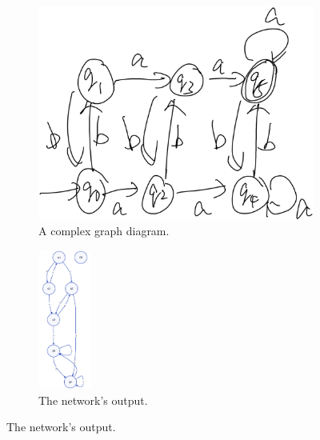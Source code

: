 \documentclass[conference]{IEEEtran}
\begin{document}
\begin{figure}[htbp]
	\vspace{1em} %
	
	\begin{subfigure}[b]{0.45\linewidth}
		\includegraphics[width=\linewidth]{ex3.png}
		\caption{A complex graph diagram.}
	\end{subfigure}
	\hfill
	\begin{subfigure}[b]{0.45\linewidth}
		\includegraphics[width=50pt, height=130pt]{ex4.png}
		\caption{The network's output.}
	\end{subfigure}
	
	\vspace{1em}
	

\end{figure}
\end{document}
